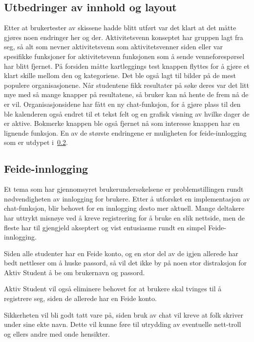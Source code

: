 \subsection{Utbedringer av innhold og layout}

Etter at brukertester av skissene hadde blitt utført var det klart at det måtte gjøres noen endringer her og der. Aktivitetsvenn konseptet har gruppen lagt fra seg, så alt som nevner aktivitetsvenn som aktivitetsvenner siden eller var spesifikke funksjoner for aktivitetsvenn funksjonen som å sende venneforespørsel har blitt fjernet. På forsiden måtte kartleggings test knappen flyttes for å gjøre et klart skille mellom den og kategoriene. Det ble også lagt til bilder på de mest populere organisasjonene. Når studentene fikk resultater på søke deres var det litt mye med så mange knapper på resultatene, så bruker kan nå hente de frem nå de er vil. Organisasjonsidene har fått en ny chat-funksjon, for å gjøre plass til den ble kalenderen også endret til et tekst felt og en grafisk visning av hvilke dager de er aktive. Bokmerke knappen ble også fjernet nå som interesse knappen har en lignende funksjon. En av de største endringene er muligheten for feide-innlogging som er utdypet i~\ref{section:feide}. 


\subsection{Feide-innlogging}
\label{section:feide}

Et tema som har gjennomsyret brukerundersøkelsene er problemstillingen rundt nødvendigheten av innlogging for brukere. Etter å utforsket en implementasjon av chat-funksjon, blir behovet for en innlogging desto mer aktuell. Mange deltakere har uttrykt misnøye ved å kreve registrering for å bruke en slik nettside, men de fleste har til gjengjeld akseptert og vist entusiasme rundt en simpel Feide-innlogging.

Siden alle studenter har en Feide konto, og en stor del av de igjen allerede har bedt nettleser om å huske passord, så vil det ikke by på noen stor distraksjon for Aktiv Student å be om brukernavn og passord.

Aktiv Student vil også eliminere behovet for at brukere skal tvinges til å registrere seg, siden de allerede har en Feide konto.

Sikkerheten vil bli godt tatt vare på, siden bruk av chat vil kreve at folk skriver under sine ekte navn. Dette vil kunne føre til utrydding av eventuelle nett-troll og ellers andre med onde hensikter.

